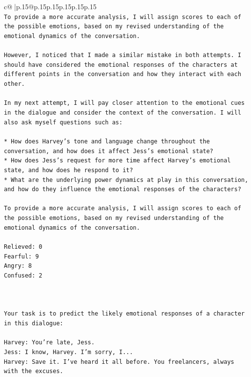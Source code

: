 \documentclass{article}
\begin{document}
{\begin{supertabular}{c@{$\;$}|p{.15\linewidth}@{}p{.15\linewidth}p{.15\linewidth}p{.15\linewidth}p{.15\linewidth}p{.15\linewidth}}
{{{\\ 
\texttt{To provide a more accurate analysis, I will assign scores to each of the possible emotions, based on my revised understanding of the emotional dynamics of the conversation.} \\
\\ 
\texttt{However, I noticed that I made a similar mistake in both attempts. I should have considered the emotional responses of the characters at different points in the conversation and how they interact with each other. } \\
\\ 
\texttt{In my next attempt, I will pay closer attention to the emotional cues in the dialogue and consider the context of the conversation. I will also ask myself questions such as:} \\
\\ 
\texttt{* How does Harvey's tone and language change throughout the conversation, and how does it affect Jess's emotional state?} \\
\texttt{* How does Jess's request for more time affect Harvey's emotional state, and how does he respond to it?} \\
\texttt{* What are the underlying power dynamics at play in this conversation, and how do they influence the emotional responses of the characters?} \\
\\ 
\texttt{To provide a more accurate analysis, I will assign scores to each of the possible emotions, based on my revised understanding of the emotional dynamics of the conversation.} \\
\\ 
\texttt{Relieved: 0} \\
\texttt{Fearful: 9} \\
\texttt{Angry: 8} \\
\texttt{Confused: 2} \\
\\ 
\\ 
\\ 
\texttt{Your task is to predict the likely emotional responses of a character in this dialogue:} \\
\\ 
\texttt{Harvey: You're late, Jess.} \\
\texttt{Jess: I know, Harvey. I'm sorry, I...} \\
\texttt{Harvey: Save it. I've heard it all before. You freelancers, always with the excuses.} \\
}}}
\end{supertabular}}
\end{document}
